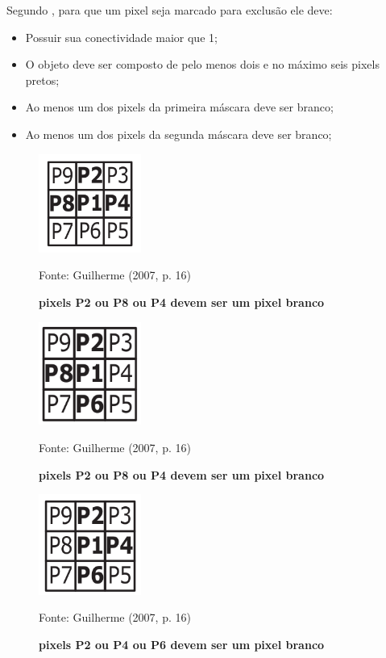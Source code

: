 \documentclass[
	12pt,				%
	oneside,			%
	a4paper,			%
	english,			%
	french,				%
	spanish,			%
	brazil,				%
	]{abntex2}
\begin{document}
Segundo \citet{guilherme:2007}, para que um pixel seja marcado para exclusão ele deve:

\begin{itemize}
\item Possuir sua conectividade maior que 1;
\item O objeto deve ser composto de pelo menos dois e no máximo seis pixels pretos;
\item Ao menos um dos pixels da primeira máscara deve ser branco;
\item Ao menos um dos pixels da segunda máscara deve ser branco;
\end{itemize}


\begin{figure}[ht]
\centering
\caption{\textbf{pixels P2 ou P8 ou P4 devem ser um pixel branco}}
\includegraphics[width=0.3\textwidth]{imagens/zhangsuen1.png}

Fonte: Guilherme (2007, p. 16)
\label{fig:zhangsuen1}
\end{figure}


\begin{figure}[ht]
\centering
\caption{\textbf{pixels P2 ou P8 ou P4 devem ser um pixel branco}}
\includegraphics[width=0.3\textwidth]{imagens/zhangsuen2.png}

Fonte: Guilherme (2007, p. 16)
\label{fig:zhangsuen2}
\end{figure}

\begin{figure}[ht]
\centering
\caption{\textbf{pixels P2 ou P4 ou P6 devem ser um pixel branco}}
\includegraphics[width=0.3\textwidth]{imagens/zhangsuen3.png}

Fonte: Guilherme (2007, p. 16)
\label{fig:zhangsuen3}
\end{figure}
\end{document}
